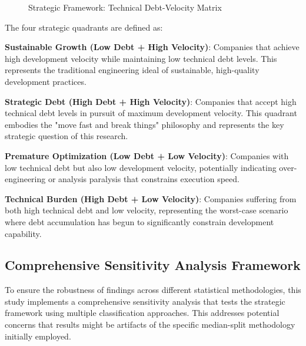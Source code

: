 \begin{figure}[htbp]
\caption{Strategic Framework: Technical Debt-Velocity Matrix}
\label{fig:strategic_framework}
\end{figure}

The four strategic quadrants are defined as:

\textbf{Sustainable Growth (Low Debt + High Velocity)}: Companies that achieve high development velocity while maintaining low technical debt levels. This represents the traditional engineering ideal of sustainable, high-quality development practices.

\textbf{Strategic Debt (High Debt + High Velocity)}: Companies that accept high technical debt levels in pursuit of maximum development velocity. This quadrant embodies the "move fast and break things" philosophy and represents the key strategic question of this research.

\textbf{Premature Optimization (Low Debt + Low Velocity)}: Companies with low technical debt but also low development velocity, potentially indicating over-engineering or analysis paralysis that constrains execution speed.

\textbf{Technical Burden (High Debt + Low Velocity)}: Companies suffering from both high technical debt and low velocity, representing the worst-case scenario where debt accumulation has begun to significantly constrain development capability.

\subsection{Comprehensive Sensitivity Analysis Framework}

To ensure the robustness of findings across different statistical methodologies, this study implements a comprehensive sensitivity analysis that tests the strategic framework using multiple classification approaches. This addresses potential concerns that results might be artifacts of the specific median-split methodology initially employed.

